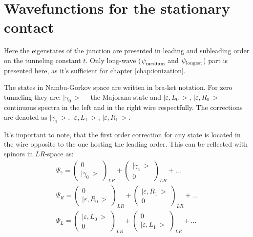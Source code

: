 \chapter{Wavefunctions for the stationary contact}
\label{app:wavefunctions_with_corrections}

	Here the eigenstates of the junction are presented in leading and subleading order on the tunneling constant $ t $. Only long-wave ($ \psi_{\mathrm{medium}}^{\mathrm{}} $ and $ \psi_{\mathrm{longest}}^{\mathrm{}} $) part is presented here, as it's sufficient for chapter \ref{chap:ionization}.	
	
	 The states in Nambu-Gorkov space are written in bra-ket notation. For zero tunneling they are:
  $ \big|\gamma_{0}\,\big> $--- the Majorana state and $ \big|\varepsilon,L_{0}\,\big> $, $ \big|\varepsilon,R_{0}\,\big> $ --- continuous spectra in the left and in the right wire respectfully.  The corrections are denoted as $ \big|\gamma_{1}\,\big> $, $ \big|\varepsilon,L_{1}\,\big> $, $ \big|\varepsilon,R_{1}\,\big> $. 
  
  It's important to note, that the first order correction for any state is located in the wire opposite to the one hosting the leading order. This can be reflected  with spinors in $ LR $-space as:  
\begin{gather}
\Psi_{\gamma}=\begin{pmatrix}0\\
\big|\gamma_{0}\,\big>
\end{pmatrix}_{LR}+\begin{pmatrix}\big|\gamma_{1}\,\big>\\
0
\end{pmatrix}_{LR}+...\\\Psi_{R}=\begin{pmatrix}0\\
\big|\varepsilon,R_{0}\,\big>
\end{pmatrix}_{LR}+\begin{pmatrix}\big|\varepsilon,R_{1}\,\big>\\
0
\end{pmatrix}_{LR}+...\\\Psi_{L}=\begin{pmatrix}\big|\varepsilon,L_{0}\,\big>\\
0
\end{pmatrix}_{LR}+\begin{pmatrix}0\\
\big|\varepsilon,L_{1}\,\big>
\end{pmatrix}_{LR}+...
\end{gather}


